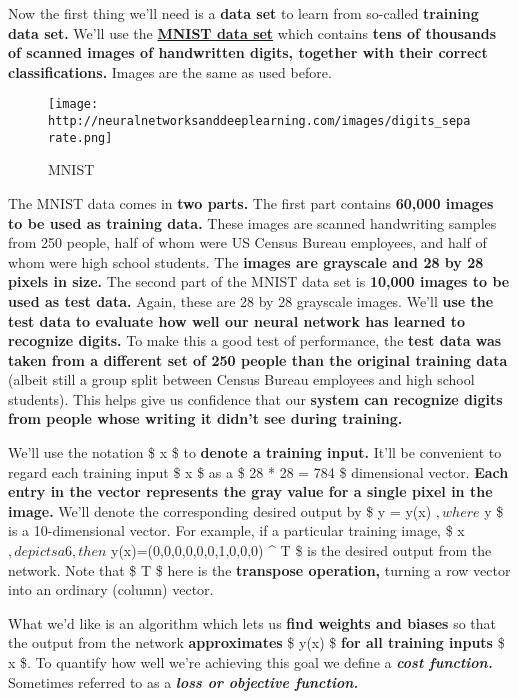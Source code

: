 \documentclass[]{article}
\begin{document}
Now the first thing we'll need is a \textbf{data set} to learn from
so-called \textbf{training data set.} We'll use the
\href{http://yann.lecun.com/exdb/mnist/}{\textbf{MNIST data set}} which
contains \textbf{tens of thousands of scanned images of handwritten
digits, together with their correct classifications.} Images are the
same as used before.

\begin{figure}[htbp]
\centering
\texttt{[image: http://neuralnetworksanddeeplearning.com/images/digits\_separate.png]}
\caption{MNIST}
\end{figure}

The MNIST data comes in \textbf{two parts.} The first part contains
\textbf{60,000 images to be used as training data.} These images are
scanned handwriting samples from 250 people, half of whom were US Census
Bureau employees, and half of whom were high school students. The
\textbf{images are grayscale and 28 by 28 pixels in size.} The second
part of the MNIST data set is \textbf{10,000 images to be used as test
data.} Again, these are 28 by 28 grayscale images. We'll \textbf{use the
test data to evaluate how well our neural network has learned to
recognize digits.} To make this a good test of performance, the
\textbf{test data was taken from a different set of 250 people than the
original training data} (albeit still a group split between Census
Bureau employees and high school students). This helps give us
confidence that our \textbf{system can recognize digits from people
whose writing it didn't see during training.}

We'll use the notation \$ x \$ to \textbf{denote a training input.}
It'll be convenient to regard each training input \$ x \$ as a \$ 28 *
28 = 784 \$ dimensional vector. \textbf{Each entry in the vector
represents the gray value for a single pixel in the image.} We'll denote
the corresponding desired output by \$ y = y(x) $, where $ y \$ is a
10-dimensional vector. For example, if a particular training image, \$ x
$, depicts a 6, then $ y(x)=(0,0,0,0,0,0,1,0,0,0) \^{} T \$ is the
desired output from the network. Note that \$ T \$ here is the
\textbf{transpose operation,} turning a row vector into an ordinary
(column) vector.

What we'd like is an algorithm which lets us \textbf{find weights and
biases} so that the output from the network \textbf{approximates} \$
y(x) \$ \textbf{for all training inputs} \$ x \$. To quantify how well
we're achieving this goal we define a \textbf{\emph{cost function.}}
Sometimes referred to as a \textbf{\emph{loss or objective function.}}
\end{document}
